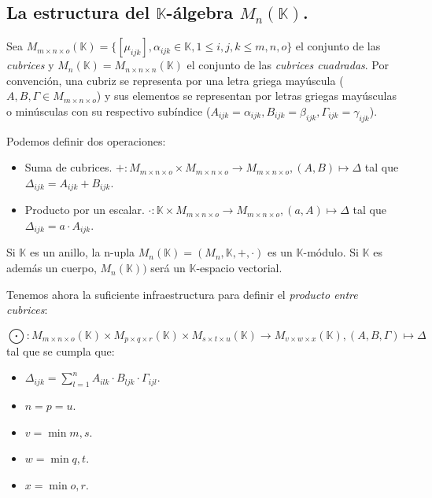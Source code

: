 \documentclass[a4paper, titlepage]{article}
\begin{document}
\subsection{La estructura del $\mathbb{K}$-álgebra $M_n (\mathbb{K})$.}

Sea $M_{m\times n\times o} (\mathbb{K}) = \{ [\mu_{ijk}], \alpha_{ijk} \in \mathbb{K}, 1 \le i,j,k \le m,n,o\}$ el conjunto de las \textit{cubrices} y $M_n (\mathbb{K}) = M_{n\times n\times n} (\mathbb{K})$ el conjunto de las \textit{cubrices cuadradas}. Por convención, una cubriz se representa por una letra griega mayúscula ($A, B, \Gamma \in M_{m\times n\times o}$) y sus elementos se representan por letras griegas mayúsculas o minúsculas con su respectivo subíndice ($A_{ijk} = \alpha_{ijk}, B_{ijk} = \beta_{ijk}, \Gamma_{ijk} = \gamma_{ijk}$).

Podemos definir dos operaciones:

\begin{itemize}
	\item Suma de cubrices. $+: M_{m\times n\times o} \times M_{m\times n\times o} \rightarrow M_{m\times n\times o}, (A, B) \mapsto \Delta$ tal que $\Delta_{ijk} = A_{ijk} + B_{ijk}$.
	\item Producto por un escalar. $\cdot: \mathbb{K} \times M_{m\times n\times o} \rightarrow M_{m\times n\times o}, (a, A) \mapsto \Delta$ tal que $\Delta_{ijk} = a \cdot A_{ijk}$.
\end{itemize}

Si $\mathbb{K}$ es un anillo, la n-upla $M_n (\mathbb{K}) = (M_n, \mathbb{K}, +, \cdot)$ es un $\mathbb{K}$-módulo. Si $\mathbb{K}$ es además un cuerpo, $M_n (\mathbb{K}))$ será un $\mathbb{K}$-espacio vectorial.

Tenemos ahora la suficiente infraestructura para definir el \textit{producto entre cubrices}:

$$\bigodot: M_{m\times n\times o} (\mathbb{K}) \times M_{p\times q\times r} (\mathbb{K}) \times M_{s\times t\times u} (\mathbb{K}) \rightarrow M_{v\times w\times x} (\mathbb{K}), (A, B, \Gamma) \mapsto \Delta$$ tal que se cumpla que:

\begin{itemize}
	\item $\Delta_{ijk} = \sum\limits_{l=1}^{n} A_{ilk} \cdot B_{ljk} \cdot \Gamma_{ijl}$.
	\item $n = p = u$.
	\item $v = \min{m, s}$.
	\item $w = \min{q, t}$.
	\item $x = \min{o, r}$.
\end{itemize}
\end{document}
